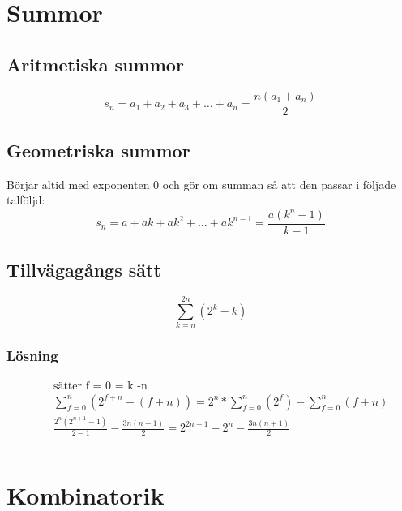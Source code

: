 \newpage

\section{Summor}
\subsection{Aritmetiska summor}
\begin{equation}
s _ { n } = a _ { 1 } + a _ { 2 } + a _ { 3 } + \ldots + a _ { n } = \frac { n \left( a _ { 1 } + a _ { n } \right) } { 2 }
\end{equation}


\subsection{Geometriska summor}
Börjar altid med exponenten 0 och gör om summan så att den passar i följade talföljd:
\begin{equation}
s _ { n } = a + a k + a k ^ { 2 } + \ldots + a k ^ { n - 1 } = \frac { a \left( k ^ { n } - 1 \right) } { k - 1 }
\end{equation}


\subsection{Tillvägagångs sätt}
\begin{equation}
\displaystyle\sum _ { k = n } ^ { 2n } (2^{k} - k)
\end{equation}
\subsubsection{Lösning}
\begin{align*}
  &\quad \text{sätter f = 0 = k -n} \\
  &\quad \displaystyle\sum _ { f = 0 } ^ { n } (2^{f+n} - (f+n)) = 2^{n} * \displaystyle\sum _ { f = 0 } ^ { n } (2^{f}) - \displaystyle\sum _ { f = 0 } ^ { n } (f+n) \\
  &\quad \frac{2^{n} (2^{n+1} -1)}{2-1} - \frac{3n(n+1)}{2} = 2^{2n+1} - 2^{n} - \frac{3n(n+1)}{2}\\
  &\quad  \\
\end{align*}


\newpage

\section{Kombinatorik}
